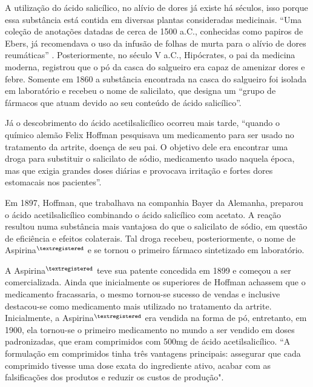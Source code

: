 A utilização do ácido salicílico, no alívio de dores já existe há séculos, isso porque essa substância está
contida em diversas plantas consideradas medicinais. “Uma coleção de anotações datadas de cerca de 1500
a.C., conhecidas como papiros de Ebers, já recomendava o uso da infusão de folhas de murta para o alívio
de dores reumáticas” \cite{aspirinabayer}. Posteriormente, no século V a.C., Hipócrates, o pai da medicina
moderna, registrou que o pó da casca do salgueiro era capaz de amenizar dores e febre. Somente em 1860 a
substância encontrada na casca do salgueiro foi isolada em laboratório e recebeu o nome de salicilato, que
designa um “grupo de fármacos que atuam devido ao seu conteúdo de ácido salicílico”. \cite{Goodman2005}

Já o descobrimento do ácido acetilsalicílico ocorreu mais tarde, “quando o químico alemão
Felix Hoffman pesquisava um medicamento para ser usado no tratamento da artrite, doença de seu pai. O
objetivo dele era encontrar uma droga para substituir o salicilato de sódio, medicamento usado naquela
época, mas que exigia grandes doses diárias e provocava irritação e fortes dores estomacais nos
pacientes”.
\cite{massabni2006}

Em 1897, Hoffman, que trabalhava na companhia Bayer da Alemanha, preparou o ácido
acetilsalicílico combinando o ácido salicílico com acetato. A reação resultou numa substância mais vantajosa do
que o salicilato de sódio, em questão de eficiência e efeitos colaterais. Tal droga recebeu,
posteriormente, o nome de Aspirina$^{\tiny{\textregistered}}$ e se tornou o primeiro fármaco sintetizado
em laboratório.  

A Aspirina$^{\tiny{\textregistered}}$ teve sua patente concedida em 1899 e começou a ser comercializada.
Ainda que inicialmente os superiores de Hoffman achassem que o medicamento fracassaria, o mesmo tornou-se
sucesso de vendas e inclusive destacou-se como medicamento mais utilizado no tratamento da artrite.
Inicialmente, a Aspirina$^{\tiny{\textregistered}}$
era vendida na forma de pó, entretanto, em 1900, ela tornou-se o primeiro medicamento no mundo a ser
vendido em doses padronizadas, que eram comprimidos com 500mg de ácido acetilsalicílico. “A formulação em
comprimidos tinha três vantagens principais: assegurar que cada comprimido tivesse uma dose exata do
ingrediente ativo, acabar com as falsificações dos produtos e reduzir os custos de
produção".\cite{aspirinabayer}

